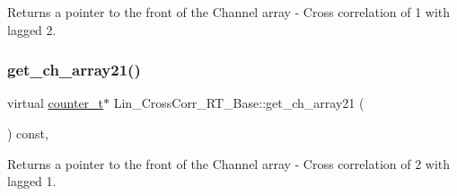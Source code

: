 Returns a pointer to the front of the Channel array -\/ Cross correlation of 1 with lagged 2. \mbox{\label{group__Lin__CorrCorr__Base__Out_ga9f075c765376a156da279b23bc18c07f}} 
\subsubsection{\texorpdfstring{get\+\_\+ch\+\_\+array21()}{get\_ch\_array21()}}
{\footnotesize\ttfamily virtual \hyperlink{types_8hpp_ac89ac912f524b3e3fa3720ea55fec966}{counter\+\_\+t}$\ast$ Lin\+\_\+\+Cross\+Corr\+\_\+\+R\+T\+\_\+\+Base\+::get\+\_\+ch\+\_\+array21 (\begin{DoxyParamCaption}{ }\end{DoxyParamCaption}) const\hspace{0.3cm}{\ttfamily [inline]}, {}}

Returns a pointer to the front of the Channel array -\/ Cross correlation of 2 with lagged 1. 